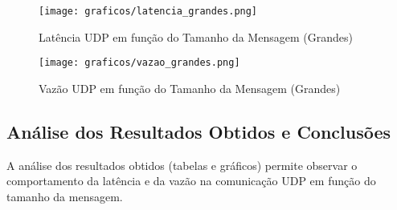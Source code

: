 \begin{figure}[H] %
    \centering
    \texttt{[image: graficos/latencia\_grandes.png]}
    \caption{Latência UDP em função do Tamanho da Mensagem (Grandes)}
    \label{fig:latencia_grandes}
\end{figure}

\begin{figure}[H] %
    \centering
    \texttt{[image: graficos/vazao\_grandes.png]}
    \caption{Vazão UDP em função do Tamanho da Mensagem (Grandes)}
    \label{fig:vazao_grandes}
\end{figure}

\subsection{Análise dos Resultados Obtidos e Conclusões}
\label{subsec:analise_exp2}
A análise dos resultados obtidos (tabelas e gráficos) permite observar o comportamento da latência e da vazão na comunicação UDP em função do tamanho da mensagem.

